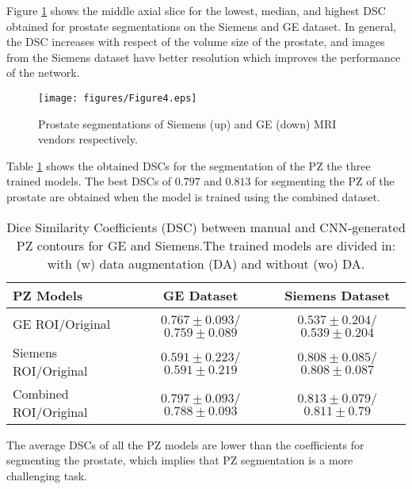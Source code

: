 Figure \ref{fig:resseg} shows the middle axial slice for the lowest, median, and highest DSC obtained for prostate segmentations on the Siemens and GE dataset. In general, the DSC increases with respect of the volume size of the prostate, and images from the Siemens dataset have better resolution which improves the performance of the network. 
\begin{figure}[h]
    \centering
    \texttt{[image: figures/Figure4.eps]}
    \label{fig:resseg}
    \caption{Prostate segmentations of Siemens (up) and GE (down) MRI vendors respectively. }
\end{figure} 

Table \ref{tab:res_pz} shows the obtained DSCs for the segmentation of the PZ the three trained models.  The best DSCs of $0.797$ and $0.813$ for segmenting the PZ of the prostate are obtained when the model is trained using the combined dataset.  
 \begin{table}[h]
    \label{tab:res_pz}
    \caption{Dice Similarity Coefficients (DSC) between manual and CNN-generated PZ contours for GE and Siemens.The trained models are divided in: with (w) data augmentation (DA) and without (wo) DA.}
    \begin{tabular}{lcc}
         \hline
          \textbf{PZ Models} & \textbf{GE Dataset} & \textbf{Siemens Dataset}\\
         \hline
         GE ROI/Original & $0.767\pm0.093$/$0.759\pm0.089$ & $0.537\pm0.204$/$0.539\pm0.204$ \\
         \hline
         Siemens ROI/Original & $0.591\pm0.223$/$0.591\pm0.219$ & $0.808\pm0.085$/$0.808\pm0.087$ \\
         \hline
         Combined ROI/Original & $\mathbf{0.797\pm0.093}$/$0.788\pm0.093$ & $\mathbf{0.813\pm0.079}$/$0.811\pm0.79$\\
         \hline
    \end{tabular}
\end{table}

The average DSCs of all the PZ models are lower than the coefficients for segmenting the prostate, which implies that PZ segmentation is a more challenging task.

